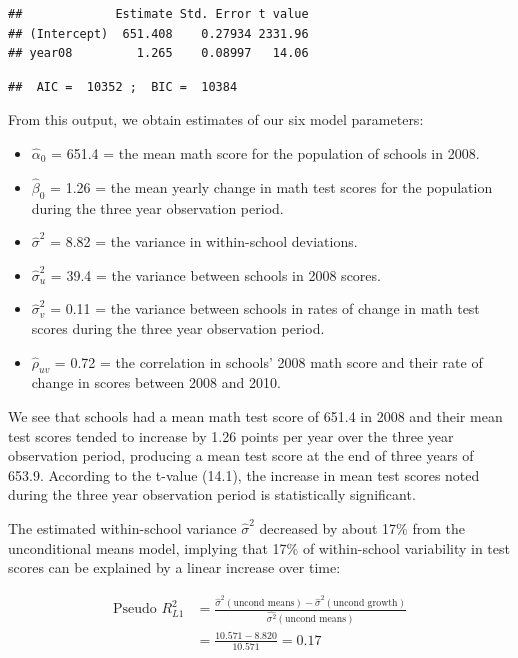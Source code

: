\documentclass[
]{krantz}
\providecommand{\tightlist}{%
  \setlength{\itemsep}{0pt}\setlength{\parskip}{0pt}}
\begin{document}
\begin{verbatim}
##             Estimate Std. Error t value
## (Intercept)  651.408    0.27934 2331.96
## year08         1.265    0.08997   14.06
\end{verbatim}

\begin{verbatim}
##  AIC =  10352 ;  BIC =  10384
\end{verbatim}

From this output, we obtain estimates of our six model parameters:

\begin{itemize}
\tightlist
\item
  \(\hat{\alpha}_{0}\) = 651.4 = the mean math score for the population of schools in 2008.
\item
  \(\hat{\beta}_{0}\) = 1.26 = the mean yearly change in math test scores for the population during the three year observation period.
\item
  \(\hat{\sigma}^2\) = 8.82 = the variance in within-school deviations.
\item
  \(\hat{\sigma}^2_u\) = 39.4 = the variance between schools in 2008 scores.
\item
  \(\hat{\sigma}^2_v\) = 0.11 = the variance between schools in rates of change in math test scores during the three year observation period.
\item
  \(\hat{\rho}_{uv}\) = 0.72 = the correlation in schools' 2008 math score and their rate of change in scores between 2008 and 2010.
\end{itemize}

We see that schools had a mean math test score of 651.4 in 2008 and their mean test scores tended to increase by 1.26 points per year over the three year observation period, producing a mean test score at the end of three years of 653.9. According to the t-value (14.1), the increase in mean test scores noted during the three year observation period is statistically significant.

The estimated within-school variance \(\hat{\sigma}^2\) decreased by about 17\% from the unconditional means model, implying that 17\% of within-school variability in test scores can be explained by a linear increase over time:

\begin{align*}
\textrm{Pseudo }R^2_{L1} & = \frac{\hat{\sigma}^2(\textrm{uncond means}) - \hat{\sigma}^2(\textrm{uncond growth})}{\hat{\sigma^2}(\textrm{uncond means})} \\
 & = \frac{10.571-8.820}{10.571}= 0.17
\end{align*}
\end{document}

